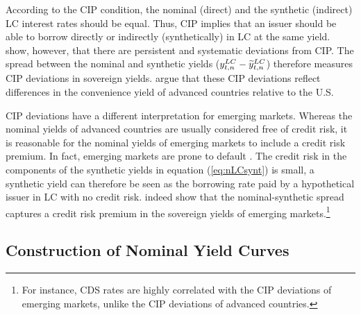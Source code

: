 {According to the CIP condition, the nominal (direct) and the synthetic (indirect) LC interest rates should be equal. 
Thus, CIP implies that an 
issuer should be able to borrow directly or indirectly (synthetically) in LC at the same yield. 
\cite*{DuTepperVerdelhan:2018} show, however, that there are persistent and systematic deviations from CIP. 
The spread between the nominal and synthetic yields ($y_{t,n} ^{LC} - \widetilde{y}_{t,n} ^{LC}$) therefore measures CIP deviations in sovereign yields.
\cite*{DuImSchreger:2018JIE} argue that these CIP deviations reflect differences in the convenience yield of advanced countries relative to the U.S.

CIP deviations have a different interpretation for emerging markets. 
Whereas the nominal yields of advanced countries are usually considered free of credit risk, it is reasonable for the nominal yields of emerging markets to include a credit risk premium.
In fact, emerging markets are prone to default  \citep{ReinhartRogoff:2011,ErceMallucci:2018}.
The credit risk in the components of the synthetic yields in equation (\ref{eq:nLCsynt}) is small, a synthetic yield can therefore be seen as the borrowing rate paid by a hypothetical issuer in LC with no credit risk. 
\cite{DuSchreger:2016JoF} indeed show that the nominal-synthetic spread captures a credit risk premium in the sovereign yields of emerging markets.\footnote{ For instance, CDS rates are highly correlated with the CIP deviations of emerging markets, unlike the CIP deviations of advanced countries.}



\subsection{Construction of Nominal Yield Curves} \label{sec:YCnom}
\iftoggle{toclinks}{\gototoc}{} %

}
